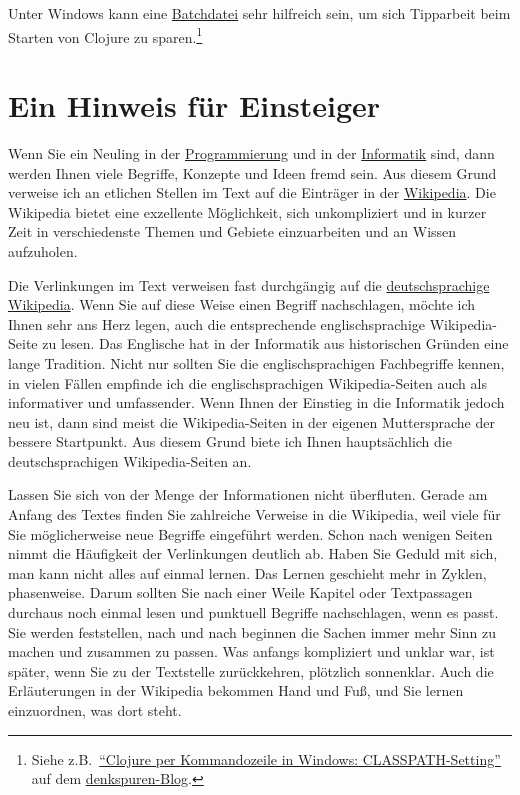Unter Windows kann eine \href{http://de.wikipedia.org/wiki/Batchdatei}{Batchdatei} sehr hilfreich sein, um sich Tipparbeit beim Starten von Clojure zu sparen.\footnote{Siehe z.B.\ \href{http://denkspuren.blogspot.de/2011/04/clojure-per-kommandozeile-in-windows.html}{"`Clojure per Kommandozeile in Windows: CLASSPATH-Setting"'} auf dem \href{http://denkspuren.blogspot.de}{denkspuren-Blog}.}

\section{Ein Hinweis für Einsteiger}

Wenn Sie ein Neuling in der \href{http://de.wikipedia.org/wiki/Programmierung}{Programmierung} und in der \href{http://de.wikipedia.org/wiki/Informatik}{Informatik} sind, dann werden Ihnen viele Begriffe, Konzepte und Ideen fremd sein. Aus diesem Grund verweise ich an etlichen Stellen im Text auf die Einträger in der \href{http://de.wikipedia.org/wiki/Wikipedia}{Wikipedia}. 
Die Wikipedia bietet eine exzellente Möglichkeit, sich unkompliziert und in kurzer Zeit in verschiedenste Themen und Gebiete einzuarbeiten und an Wissen aufzuholen.

Die Verlinkungen im Text verweisen fast durchgängig auf die \href{http://de.wikipedia.org}{deutschsprachige Wikipedia}. Wenn Sie auf diese Weise einen Begriff nachschlagen, möchte ich Ihnen sehr ans Herz legen, auch die entsprechende englischsprachige Wikipedia-Seite zu lesen. Das Englische hat in der Informatik aus historischen Gründen eine lange Tradition. Nicht nur sollten Sie die englischsprachigen Fachbegriffe kennen, in vielen Fällen empfinde ich die englischsprachigen Wikipedia-Seiten auch als informativer und umfassender. Wenn Ihnen der Einstieg in die Informatik jedoch neu ist, dann sind meist die Wikipedia-Seiten in der eigenen Muttersprache der bessere Startpunkt. Aus diesem Grund biete ich Ihnen hauptsächlich die deutschsprachigen Wikipedia-Seiten an.

Lassen Sie sich von der Menge der Informationen nicht überfluten. Gerade am Anfang des Textes finden Sie zahlreiche Verweise in die Wikipedia, weil viele für Sie möglicherweise neue Begriffe eingeführt werden. Schon nach wenigen Seiten nimmt die Häufigkeit der Verlinkungen deutlich ab. Haben Sie Geduld mit sich, man kann nicht alles auf einmal lernen. Das Lernen geschieht mehr in Zyklen, phasenweise. Darum sollten Sie nach einer Weile Kapitel oder Textpassagen durchaus noch einmal lesen und punktuell Begriffe nachschlagen, wenn es passt. Sie werden feststellen, nach und nach beginnen die Sachen immer mehr Sinn zu machen und zusammen zu passen. Was anfangs kompliziert und unklar war, ist später, wenn Sie zu der Textstelle zurückkehren, plötzlich sonnenklar. Auch die Erläuterungen in der Wikipedia bekommen Hand und Fuß, und Sie lernen einzuordnen, was dort steht.